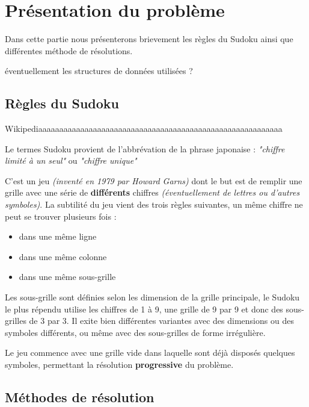 \chapter{Présentation du problème}
  
Dans cette partie nous présenterons brievement les règles du Sudoku ainsi que différentes méthode de résolutions.

\textcolor{BurntOrange}{éventuellement les structures de données utilisées ?}

\section{Règles du Sudoku}

\textcolor{BurntOrange}{Wikipediaaaaaaaaaaaaaaaaaaaaaaaaaaaaaaaaaaaaaaaaaaaaaaaaaaaaaaaaaa}


Le termes Sudoku provient de l'abbrévation de la phrase japonaise : \textit{"chiffre limité à un seul"} ou \textit{"chiffre unique"}

C'est un jeu \textit{(inventé en 1979 par Howard Garns)} dont le but est de remplir une grille avec une série de \textbf{différents} chiffres \textit{(éventuellement de lettres ou d'autres symboles)}. La subtilité du jeu vient des trois règles suivantes, un même chiffre ne peut se trouver plusieurs fois :

\begin{itemize}

\item dans une même ligne
\item dans une même colonne
\item dans une même sous-grille

\end{itemize}

Les sous-grille sont définies selon les dimension de la grille principale, le Sudoku le plus répendu utilise les chiffres de 1 à 9, une grille de 9 par 9 et donc des sous-grilles de 3 par 3. Il exite bien différentes variantes avec des dimensions ou des symboles différents, ou même avec des sous-grilles de forme irrégulière.

Le jeu commence avec une grille vide dans laquelle sont déjà disposés quelques symboles, permettant la résolution \textbf{progressive} du problème.




\section{Méthodes de résolution}
